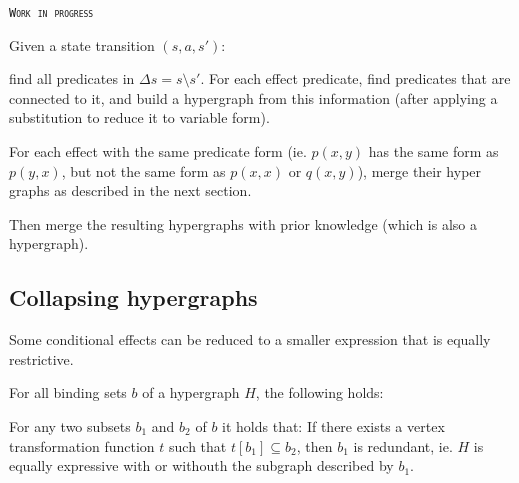 \documentclass[../Master.tex]{subfiles}
\begin{document}
\textsc{\texttt{Work in progress}}


Given a state transition $(s,a,s')$:

find all predicates in $\Delta s = s \setminus s'$. For each effect predicate, find predicates that are connected to it, and build a hypergraph from this information (after applying a substitution to reduce it to variable form). 

For each effect with the same predicate form (ie. $p(x,y)$ has the same form as $p(y,x)$, but not the same form as $p(x,x)$ or $q(x,y)$), merge their hyper graphs as described in the next section. 

Then merge the resulting hypergraphs with prior knowledge (which is also a hypergraph).

\subsection{Collapsing hypergraphs}

Some conditional effects can be reduced to a smaller expression that is equally restrictive.

For all binding sets $b$ of a hypergraph $H$, the following holds:

For any two subsets $b_1$ and $b_2$ of $b$ it holds that: If there exists a vertex transformation function $t$ such that $t\left[b_1\right] \subseteq b_2$, then $b_1$ is redundant, ie. $H$ is equally expressive with or withouth the subgraph described by $b_1$.
\end{document}
